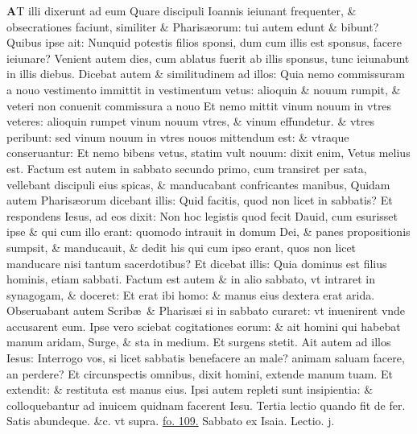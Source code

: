 \documentclass[a5paper,10pt]{book}
\def\leftmarginnote{%
	\lrmarginnote{\hskip -\marginparsep \hskip -6.5em}}
\def\rightmarginnote{%
	\lrmarginnote{\hskip\columnwidth \hskip -1em}}
\def\ae{æ}
\begin{document}
\begin{multicols*}{2}
\vspace{-.25em}
\lettrine[lines=2]{\bfseries \color{red} A}{}T illi\leftmarginnote{\begin{flushright}ca. 5.\end{flushright}} dixerunt ad eum Quare discipuli Ioannis ieiunant frequenter, \& obsecrationes faciunt, similiter \& Pharis\ae orum: tui autem edunt \& bibunt?
Quibus ipse ait: Nunquid potestis filios sponsi, dum cum illis est sponsus, facere ieiunare?
Venient autem dies, cum ablatus fuerit ab illis sponsus, tunc ieiunabunt in illis diebus.
Dicebat autem \& similitudinem ad illos: Quia nemo commissuram a nouo vestimento immittit in vestimentum vetus: alioquin \& nouum rumpit, \& veteri non conuenit commissura a nouo Et nemo mittit vinum nouum in vtres veteres: alioquin rumpet vinum nouum vtres, \& vinum effundetur. \& vtres peribunt: sed vinum nouum in vtres nouos mittendum est: \& vtraque conseruantur: Et nemo bibens vetus, statim vult nouum: dixit enim, Vetus melius est.\rightmarginnote{ca. 6.}
Factum est autem in sabbato secundo primo, cum transiret per sata, vellebant
discipuli eius spicas, \& manducabant confricantes manibus, Quidam autem Pharis\ae orum dicebant illis: Quid facitis, quod non licet in sabbatis? Et respondens Iesus, ad eos dixit: Non hoc legistis quod fecit Dauid, cum esurisset ipse \& qui cum illo erant: quomodo intrauit in domum Dei, \& panes propositionis sumpsit, \& manducauit, \& dedit his qui cum ipso erant, quos non licet manducare nisi tantum sacerdotibus?
Et dicebat illis: Quia dominus est filius hominis, etiam sabbati.
Factum est autem \& in alio sabbato, vt intraret in synagogam, \& doceret: Et erat ibi homo: \& manus eius dextera erat arida.
Obseruabant autem Scrib\ae \ \& Pharis\ae i si in sabbato curaret: vt inuenirent vnde accusarent eum.
Ipse vero sciebat cogitationes eorum: \& ait homini qui habebat manum aridam, Surge, \& sta in medium.
Et surgens stetit. Ait autem ad illos Iesus: Interrogo vos, si licet sabbatis benefacere an male? animam saluam facere, an perdere?
Et circunspectis omnibus, dixit homini, extende manum tuam.
Et extendit: \& restituta est manus eius.
Ipsi autem repleti sunt insipientia: \& colloquebantur ad inuicem quidnam facerent Iesu.
\newline \color{red} Tertia lectio quando fit de fer. \color{black} Satis abundeque. \color{red} \&c. vt supra. \color{black} \hyperlink{page.109}{fo. 109.}
\newline {} \color{red} \hypertarget{SAT-SECUNDA-ADV}{Sabbato} ex Isaia. \hfill Lectio. j. \color{black}

\end{multicols*}
\end{document}
